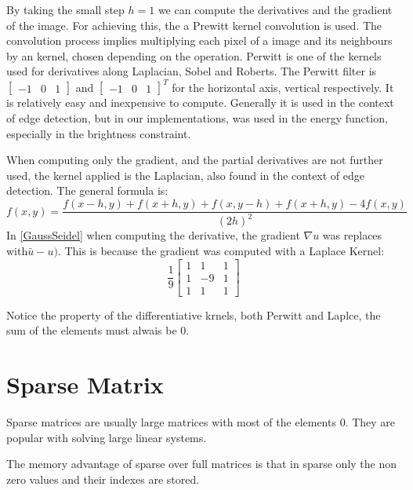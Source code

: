 \documentclass[12pt,a4paper,twoside]{report}
\begin{document}
{By taking the small step $h = 1$ we can compute the derivatives and the gradient of the image.
For achieving this, the a Prewitt kernel convolution is used. The convolution process implies multiplying each pixel of a image and its neighbours by an kernel, chosen depending on the operation. Perwitt is one of the kernels used for derivatives along  Laplacian, Sobel and Roberts. The Perwitt filter is $\begin{bmatrix}-1 & 0 & 1\end{bmatrix}$ and  
$\begin{bmatrix}-1 & 0 & 1\end{bmatrix}^T$  for the horizontal axis, vertical respectively. It is relatively easy and inexpensive to compute. Generally it is used in the context of edge detection, but in our implementations, was used in the energy function, especially in the brightness constraint. 

When computing only the gradient, and the partial derivatives are not further used, the kernel applied is the Laplacian, also found in the context of edge detection. The general formula is:
\begin{equation}
f(x, y) =  \frac{f(x-h, y) + f(x+h,y) +f(x,y-h) +f(x+h,y) - 4f(x,y)}
{(2h)^2}
\end{equation}
 In \ref{GaussSeidel} when computing the derivative, the gradient $\nabla u$ was replaces with$\bar{u} - u)$. This is because the gradient was computed with a Laplace Kernel:
 \begin{equation}
 \frac{1}{9}
 \begin{bmatrix}
 	1 & 1 & 1 \\
 	1 & -9 & 1 \\
 	1 & 1 & 1
 \end{bmatrix}
 \end{equation}


Notice the property of the differentiative krnels, both Perwitt and Laplce, the sum of the elements must alwais be 0. 

\section{Sparse Matrix}

Sparse matrices are usually large matrices with most of the elements $0$. They are popular with solving large linear systems.

The memory advantage of sparse over full matrices is that in sparse only the non zero values and their indexes are stored. 

}
\end{document}

